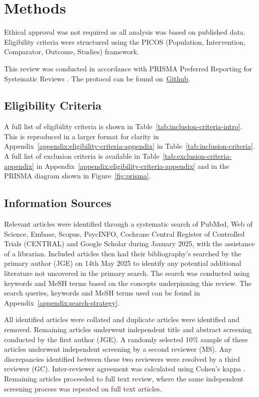 \section{Methods}

\noindent Ethical approval was not required as all analysis was based on published data. Eligibility criteria were structured using the PICOS (Population, Intervention, Comparator, Outcome, Studies) framework. 

This review was conducted in accordance with PRISMA Preferred Reporting for Systematic Reviews \cite{pagePRISMA2020Statement2021}. The protocol can be found on~\href{https://github.com/jackgedge/iifo_systematic_review/blob/main/docs/plan.md}{Github}.


\subsection{Eligibility Criteria}



\noindent A full list of eligibility criteria is shown in Table~\ref{tab:inclusion-criteria-intro}. This is reproduced in a larger format for clarity in Appendix~\ref{appendix:eligibility-criteria-appendix} in Table~\ref{tab:inclusion-criteria}. A full list of exclusion criteria is available in Table~\ref{tab:exclusion-criteria-appendix} in Appendix~\ref{appendix:eligibility-criteria-appendix} and in the PRISMA diagram shown in Figure~\ref{fig:prisma}.

\subsection{Information Sources}

\noindent Relevant articles were identified through a systematic search of PubMed, Web of Science, Embase, Scopus, PsycINFO, Cochrane Central Register of Controlled Trials (CENTRAL) and Google Scholar during January 2025, with the assistance of a librarian. Included articles then had their bibliography's searched by the primary author (JGE) on 14th May 2025 to identify any potential additional literature not uncovered in the primary search. The search was conducted using keywords and MeSH terms based on the concepts underpinning this review. The search queries, keywords and MeSH terms used can be found in Appendix~\ref{appendix:search-strategy}. 

All identified articles were collated and duplicate articles were identified and removed. Remaining articles underwent independent title and abstract screening conducted by the first author (JGE). A randomly selected 10\% sample of these articles underwent independent screening by a second reviewer (MS). Any discrepancies identified between these two reviewers were resolved by a third reviewer (GC). Inter-reviewer agreement was calculated using Cohen's kappa \cite{Machin_2008}. Remaining articles proceeded to full text review, where the same independent screening process was repeated on full text articles.

